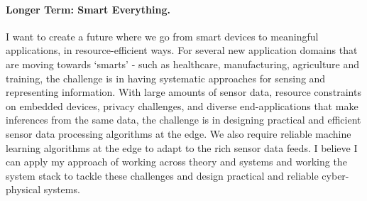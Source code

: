 \documentclass[10pt]{article}
\begin{document}
\paragraph{Longer Term: Smart Everything. }
I want to create a future where we go from smart devices to meaningful applications, in resource-efficient ways. %
For several new application domains that are moving towards `smarts' - such as healthcare, manufacturing, agriculture and training, the challenge is in having systematic approaches for sensing and representing information. %
With large amounts of sensor data, resource constraints on embedded devices, privacy challenges, and diverse end-applications that make inferences from the same data, the challenge is in designing practical and efficient sensor data processing algorithms at the edge. We also require reliable machine learning algorithms at the edge to adapt to the rich sensor data feeds. %
I believe I can apply my approach of working across theory and systems and working the system stack to tackle these challenges and design practical and reliable cyber-physical systems. 

\end{document}
